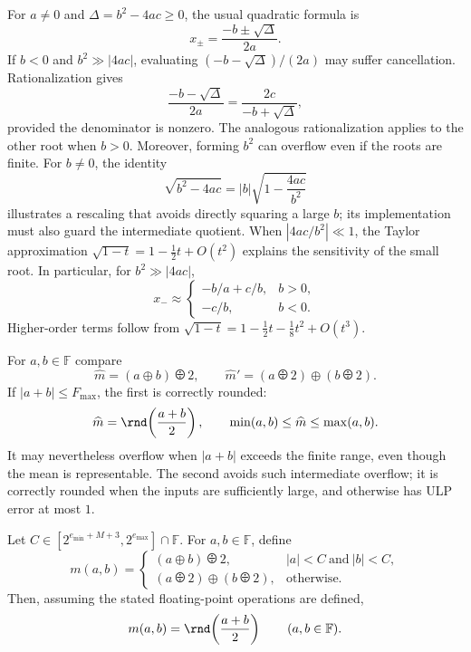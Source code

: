 \begin{example}
For $a\ne0$ and $\Delta=b^2-4ac\ge0$, the usual quadratic formula is
\[
 x_{\pm}=\frac{-b\pm\sqrt\Delta}{2a}.
\]
If $b<0$ and $b^2\gg|4ac|$, evaluating
$(-b-\sqrt\Delta)/(2a)$ may suffer cancellation. Rationalization gives
\[
 \frac{-b-\sqrt\Delta}{2a}
   =\frac{2c}{-b+\sqrt\Delta},
\]
provided the denominator is nonzero. The analogous rationalization
applies to the other root when $b>0$. Moreover, forming $b^2$ can
overflow even if the roots are finite. For $b\ne0$, the identity
\[
 \sqrt{b^2-4ac}=|b|\sqrt{1-\frac{4ac}{b^2}}
\]
illustrates a rescaling that avoids directly squaring a large $b$;
its implementation must also guard the intermediate quotient.
When $|4ac/b^2|\ll1$, the Taylor approximation
$\sqrt{1-t}=1-\tfrac12t+O(t^2)$ explains the sensitivity of the
small root. In particular, for $b^2\gg|4ac|$,
\[
 x_-\approx\begin{cases}
 -b/a+c/b,&b>0, \\
 -c/b,&b<0.
 \end{cases}
\]
Higher-order terms follow from
$\sqrt{1-t}=1-\tfrac12t-\tfrac18t^2+O(t^3)$.
\end{example}

\begin{example}
For $a, b\in\mathbb F$ compare
\[
 \widehat m=(a\oplus b)\odiv2,
 \qquad \widehat m'=(a\odiv2)\oplus(b\odiv2).
\]
If $|a+b|\le F_{\max}$, the first is correctly rounded:
\[
 \widehat m=\rnd\!\left(\frac{a+b}{2}\right),
 \qquad \min(a, b)\le\widehat m\le\max(a, b).
\]
It may nevertheless overflow when $|a+b|$ exceeds the finite range,
even though the mean is representable. The second avoids such
intermediate overflow; it is correctly rounded when the inputs are
sufficiently large, and otherwise has ULP error at most $1$.
\end{example}

\begin{theorem}
Let $C\in[2^{e_{\min}+M+3},2^{e_{\max}}]\cap\mathbb F$. For
$a, b\in\mathbb F$, define
\[
 m(a, b)=\begin{cases}
 (a\oplus b)\odiv2,&|a|<C\ \text{and}\ |b|<C, \\
 (a\odiv2)\oplus(b\odiv2),&\text{otherwise}.
 \end{cases}
\]
Then, assuming the stated floating-point operations are defined,
\[
 m(a, b)=\rnd\!\left(\frac{a+b}{2}\right)
 \qquad(a, b\in\mathbb F).
\]
\end{theorem}

